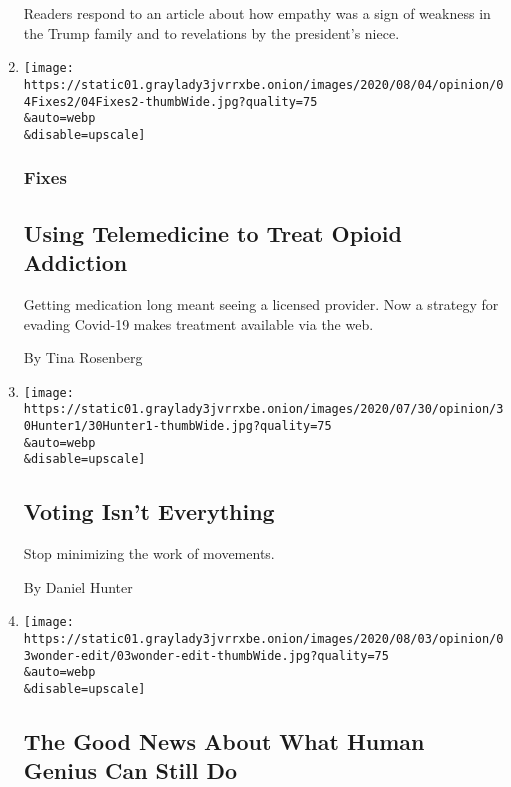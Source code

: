 \begin{enumerate}
  Readers respond to an article about how empathy was a sign of weakness
  in the Trump family and to revelations by the president's niece.
\item
  \href{/2020/08/04/opinion/opioid-telemedicine-covid.html}{}

  \texttt{[image: https://static01.graylady3jvrrxbe.onion/images/2020/08/04/opinion/04Fixes2/04Fixes2-thumbWide.jpg?quality=75\\\&auto=webp\\\&disable=upscale]}

  \hypertarget{fixes}{%
  \subsubsection{Fixes}\label{fixes}}

  \hypertarget{using-telemedicine-to-treat-opioid-addiction}{%
  \subsection{Using Telemedicine to Treat Opioid
  Addiction}\label{using-telemedicine-to-treat-opioid-addiction}}

  Getting medication long meant seeing a licensed provider. Now a
  strategy for evading Covid-19 makes treatment available via the web.

  By Tina Rosenberg
\item
  \href{/2020/08/04/opinion/voting-2020-election-blm-movement.html}{}

  \texttt{[image: https://static01.graylady3jvrrxbe.onion/images/2020/07/30/opinion/30Hunter1/30Hunter1-thumbWide.jpg?quality=75\\\&auto=webp\\\&disable=upscale]}

  \hypertarget{voting-isnt-everything-1}{%
  \subsection{Voting Isn't Everything}\label{voting-isnt-everything-1}}

  Stop minimizing the work of movements.

  By Daniel Hunter
\item
  \href{/2020/08/03/opinion/spacex-stonehenge-mars.html}{}

  \texttt{[image: https://static01.graylady3jvrrxbe.onion/images/2020/08/03/opinion/03wonder-edit/03wonder-edit-thumbWide.jpg?quality=75\\\&auto=webp\\\&disable=upscale]}

  \hypertarget{the-good-news-about-what-human-genius-can-still-do}{%
  \subsection{The Good News About What Human Genius Can Still
  Do}\label{the-good-news-about-what-human-genius-can-still-do}}


\end{enumerate}
